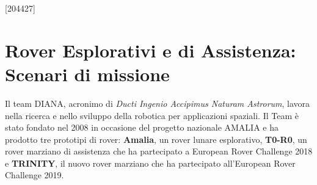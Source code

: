 \documentclass[%
corpo=11pt,
twoside,
 stile=classica,
oldstyle,
greek,%
]{toptesi}
\begin{document}



\begin{frontespizio}
\nomeateneo{}%
\FacoltaDi{}%
\facolta[III]{}%
\renewcommand*\IDlabel{\\\quad Matricola: }%
[204427]%
\end{frontespizio}



\ringraziamenti %




\mainmatter
\indici
\chapter{Rover Esplorativi e di Assistenza: Scenari di missione}
Il team DIANA, acronimo di  \textit{Ducti Ingenio Accipimus Naturam Astrorum}, lavora nella ricerca e nello sviluppo della robotica per applicazioni spaziali.
Il Team è stato fondato nel 2008 in occasione del progetto nazionale AMALIA e ha prodotto tre prototipi di rover: \textbf{Amalia}, un rover lunare esplorativo, \textbf{T0-R0}, un rover marziano di assistenza che ha partecipato a European Rover Challenge 2018 e \textbf{TRINITY}, il nuovo rover marziano che ha partecipato all'European Rover Challenge 2019.
\end{document}
